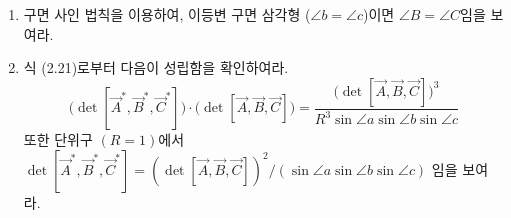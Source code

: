 \documentclass{article}
\begin{document}
\begin{enumerate}[1.]
  \item 구면 사인 법칙을 이용하여, 이등변 구면 삼각형
    ($\angle b = \angle c$)이면 $\angle B = \angle C$임을 보여라.

  \item 식 (2.21)로부터 다음이 성립함을 확인하여라.
    \[
      \bigl(\det[\vec{A}^*,\vec{B}^*,\vec{C}^*]\bigr)
      \cdot\bigl(\det[\vec{A},\vec{B},\vec{C}]\bigr)
      = \frac{\bigl(\det[\vec{A},\vec{B},\vec{C}]\bigr)^3}
             {R^3\sin\angle a\sin\angle b\sin\angle c}
    \]
    또한 단위구 $(R=1)$에서
    $\det[\vec{A}^*,\vec{B}^*,\vec{C}^*] = (\det[\vec{A},\vec{B},\vec{C}])^2/(\sin\angle a\sin\angle b\sin\angle c)$
    임을 보여라.
\end{enumerate}
\end{document}
